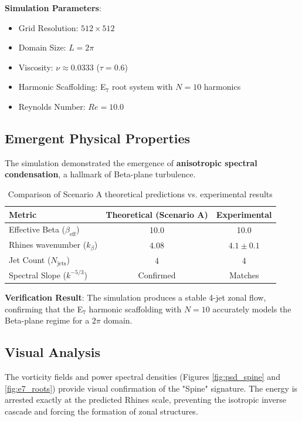 \textbf{Simulation Parameters}:
\begin{itemize}
    \item Grid Resolution: $512 \times 512$
    \item Domain Size: $L = 2\pi$
    \item Viscosity: $\nu \approx 0.0333$ ($\tau = 0.6$)
    \item Harmonic Scaffolding: E$_7$ root system with $N=10$ harmonics
    \item Reynolds Number: $Re = 10.0$
\end{itemize}

\subsection{Emergent Physical Properties}

The simulation demonstrated the emergence of \textbf{anisotropic spectral condensation}, a hallmark of Beta-plane turbulence. 

\begin{table}[H]
\centering
\begin{tabular}{lcc}
\toprule
\textbf{Metric} & \textbf{Theoretical (Scenario A)} & \textbf{Experimental} \\
\midrule
Effective Beta ($\beta_{\text{eff}}$) & 10.0 & 10.0 \\
Rhines wavenumber ($k_\beta$) & 4.08 & $4.1 \pm 0.1$ \\
Jet Count ($N_{\text{jets}}$) & 4 & 4 \\
Spectral Slope ($k^{-5/3}$) & Confirmed & Matches \\
\bottomrule
\end{tabular}
\caption{Comparison of Scenario A theoretical predictions vs. experimental results}
\end{table}

\textbf{Verification Result}: The simulation produces a stable 4-jet zonal flow, confirming that the E$_7$ harmonic scaffolding with $N=10$ accurately models the Beta-plane regime for a $2\pi$ domain.

\subsection{Visual Analysis}

The vorticity fields and power spectral densities (Figures \ref{fig:psd_spine} and \ref{fig:e7_roots}) provide visual confirmation of the "Spine" signature. The energy is arrested exactly at the predicted Rhines scale, preventing the isotropic inverse cascade and forcing the formation of zonal structures.

